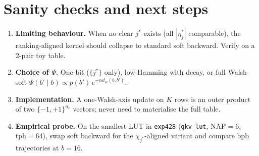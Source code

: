 \documentclass[11pt]{article}
\begin{document}
\section{Sanity checks and next steps}
\label{sec:next}

\begin{enumerate}
\setlength{\itemsep}{1pt}
    \item \textbf{Limiting behaviour.} When no clear $j^*$ exists (all $|\eta^*_j|$ comparable), the ranking-aligned kernel should collapse to standard soft backward. Verify on a 2-pair toy table.
    \item \textbf{Choice of $\Psi$.} One-bit ($\{j^*\}$ only), low-Hamming with decay, or full Walsh-soft
    $\Psi(b' \mid b) \propto p(b')\, e^{-\alpha d_H(b, b')}$.
    \item \textbf{Implementation.} A one-Walsh-axis update on $K$ rows is an outer product of two $\{-1, +1\}^{n_c}$ vectors; never need to materialise the full table.
    \item \textbf{Empirical probe.} On the smallest LUT in \texttt{exp428} (\texttt{qkv\_lut}, $\mathrm{NAP} = 6$, $\mathrm{tph} = 64$), swap soft backward for the $\chi_{j^*}$-aligned variant and compare bpb trajectories at $b = 16$.
\end{enumerate}
\end{document}
